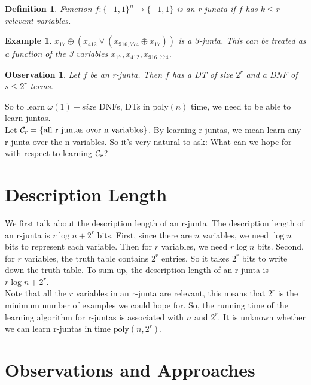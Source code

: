 \documentclass[12pt]{article}
\newtheorem{definition}[theorem]{Definition}
\newtheorem{observation}[theorem]{Observation}
\newtheorem{example}[theorem]{Example}
\newcommand{\calc}{{\cal C}}
\newcommand{\poly}{\mathrm{poly}}
\begin{document}
\begin{definition}
Function $f: \{ -1, 1 \}^n \rightarrow \{ -1,1 \}$ is an r-junata if
$f$ has $k \le r$ relevant variables.
\end{definition}

\begin{example}
$x_{17} \oplus (x_{412} \lor (x_{916,774} \oplus x_{17}))$ is a
3-junta. This can be treated as a function of the 3 variables $x_{17},
x_{412}, x_{916,774}$.
\end{example}

\begin{observation}
Let $f$ be an r-junta. Then $f$ has a DT of size $2^r$ and a DNF of $s
\le 2^r$ terms.
\end{observation}

So to learn $\omega(1)-size$ DNFs, DTs in $\poly(n)$ time, we need to
be able to learn juntas. \\

Let $\calc_r = \{\text {all r-juntas over n variables} \}$. By
learning r-juntas, we mean learn any r-junta over the n variables. So
it's very natural to ask: What can we hope for with respect to
learning $\calc_r$? \\

\section{Description Length}

We first talk about the description length of an r-junta. The
description length of an r-junta is $r \log n + 2^r$ bits. First,
since there are $n$ variables, we need $\log n$ bits to represent each
variable. Then for $r$ variables, we need $r \log n$ bits. Second,
for $r$ variables, the truth table contains $2^r$ entries. So it takes
$2^r$ bits to write down the truth table.  To sum up, the description
length of an r-junta is $r \log n + 2^r$. \\

Note that all the $r$ variables in an r-junta are relevant, this means
that $2^r$ is the minimum number of examples we could hope for. So, the
running time of the learning algorithm for r-juntas is associated 
with $n$ and $2^r$. It is unknown whether we can learn r-juntas in
time $\poly (n, 2^r)$. \\

\section{Observations and Approaches}
\end{document}
